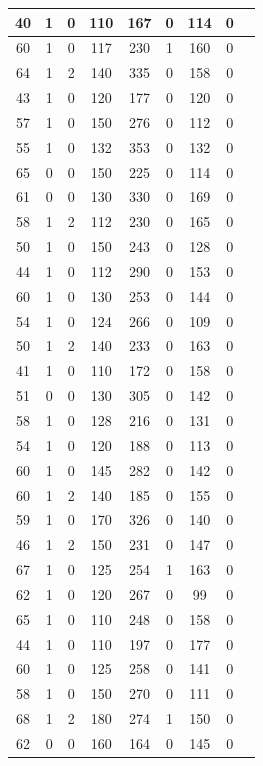 \documentclass{article}
\begin{document}
\begin{longtable}{
|
c|c|c|c|c|c|c|c|c|}
\hline
40 & 1 & 0 & 110 & 167 & 0 & 114 & 0 \\
\hline
60 & 1 & 0 & 117 & 230 & 1 & 160 & 0 \\
\hline
64 & 1 & 2 & 140 & 335 & 0 & 158 & 0 \\
\hline
43 & 1 & 0 & 120 & 177 & 0 & 120 & 0 \\
\hline
57 & 1 & 0 & 150 & 276 & 0 & 112 & 0 \\
\hline
55 & 1 & 0 & 132 & 353 & 0 & 132 & 0 \\
\hline
65 & 0 & 0 & 150 & 225 & 0 & 114 & 0 \\
\hline
61 & 0 & 0 & 130 & 330 & 0 & 169 & 0 \\
\hline
58 & 1 & 2 & 112 & 230 & 0 & 165 & 0 \\
\hline
50 & 1 & 0 & 150 & 243 & 0 & 128 & 0 \\
\hline
44 & 1 & 0 & 112 & 290 & 0 & 153 & 0 \\
\hline
60 & 1 & 0 & 130 & 253 & 0 & 144 & 0 \\
\hline
54 & 1 & 0 & 124 & 266 & 0 & 109 & 0 \\
\hline
50 & 1 & 2 & 140 & 233 & 0 & 163 & 0 \\
\hline
41 & 1 & 0 & 110 & 172 & 0 & 158 & 0 \\
\hline
51 & 0 & 0 & 130 & 305 & 0 & 142 & 0 \\
\hline
58 & 1 & 0 & 128 & 216 & 0 & 131 & 0 \\
\hline
54 & 1 & 0 & 120 & 188 & 0 & 113 & 0 \\
\hline
60 & 1 & 0 & 145 & 282 & 0 & 142 & 0 \\
\hline
60 & 1 & 2 & 140 & 185 & 0 & 155 & 0 \\
\hline
59 & 1 & 0 & 170 & 326 & 0 & 140 & 0 \\
\hline
46 & 1 & 2 & 150 & 231 & 0 & 147 & 0 \\
\hline
67 & 1 & 0 & 125 & 254 & 1 & 163 & 0 \\
\hline
62 & 1 & 0 & 120 & 267 & 0 & 99 & 0 \\
\hline
65 & 1 & 0 & 110 & 248 & 0 & 158 & 0 \\
\hline
44 & 1 & 0 & 110 & 197 & 0 & 177 & 0 \\
\hline
60 & 1 & 0 & 125 & 258 & 0 & 141 & 0 \\
\hline
58 & 1 & 0 & 150 & 270 & 0 & 111 & 0 \\
\hline
68 & 1 & 2 & 180 & 274 & 1 & 150 & 0 \\
\hline
62 & 0 & 0 & 160 & 164 & 0 & 145 & 0 \\

\end{longtable}
\end{document}
